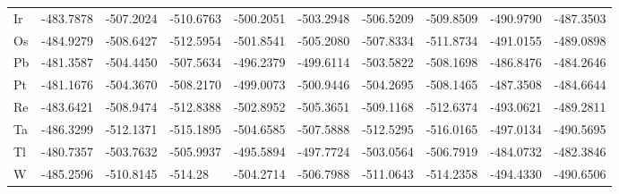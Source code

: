 \begin{table}[htbp]
{\begin{tabular}{l *{9}{l}}
      Ir & -483.7878 & -507.2024 & -510.6763 & -500.2051 & -503.2948 & -506.5209 & -509.8509 & -490.9790 & -487.3503 \\
      Os & -484.9279 & -508.6427 & -512.5954 & -501.8541 & -505.2080 & -507.8334 & -511.8734 & -491.0155 & -489.0898 \\
      Pb & -481.3587 & -504.4450 & -507.5634 & -496.2379 & -499.6114 & -503.5822 & -508.1698 & -486.8476 & -484.2646 \\
      Pt & -481.1676 & -504.3670 & -508.2170 & -499.0073 & -500.9446 & -504.2695 & -508.1465 & -487.3508 & -484.6644 \\
      Re & -483.6421 & -508.9474 & -512.8388 & -502.8952 & -505.3651 & -509.1168 & -512.6374 & -493.0621 & -489.2811 \\
      Ta & -486.3299 & -512.1371 & -515.1895 & -504.6585 & -507.5888 & -512.5295 & -516.0165 & -497.0134 & -490.5695 \\
      Tl & -480.7357 & -503.7632 & -505.9937 & -495.5894 & -497.7724 & -503.0564 & -506.7919 & -484.0732 & -482.3846 \\
      W  & -485.2596 & -510.8145 & -514.28   & -504.2714 & -506.7988 & -511.0643 & -514.2358 & -494.4330 & -490.6506 \\
      \bottomrule
    \end{tabular}
  }
\end{table}

